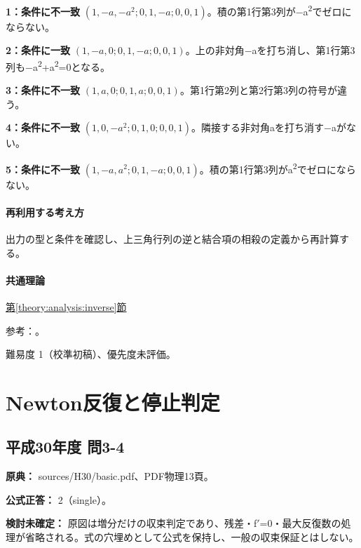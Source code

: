 \noindent\textbf{1：条件に不一致} \((1,-a,-a^2;0,1,-a;0,0,1)\)。積の第1行第3列が−a\textsuperscript{2}でゼロにならない。\par

\noindent\textbf{2：条件に一致} \((1,-a,0;0,1,-a;0,0,1)\)。上の非対角−aを打ち消し、第1行第3列も−a\textsuperscript{2}+a\textsuperscript{2}=0となる。\par

\noindent\textbf{3：条件に不一致} \((1,a,0;0,1,a;0,0,1)\)。第1行第2列と第2行第3列の符号が違う。\par

\noindent\textbf{4：条件に不一致} \((1,0,-a^2;0,1,0;0,0,1)\)。隣接する非対角aを打ち消す−aがない。\par

\noindent\textbf{5：条件に不一致} \((1,-a,a^2;0,1,-a;0,0,1)\)。積の第1行第3列がa\textsuperscript{2}でゼロにならない。\par

\paragraph{再利用する考え方} 出力の型と条件を確認し、上三角行列の逆と結合項の相殺の定義から再計算する。

\paragraph{共通理論} \hyperref[theory:analysis:inverse]{第\ref*{theory:analysis:inverse}節}

\par 参考：\cite{mit_inverse2007}。

\par 難易度 1（校準初稿）、優先度未評価。

\section{Newton反復と停止判定}

\subsection{平成30年度 問3-4}
\label{q:h30-reg-basic-3-4}

\noindent\textbf{原典：} sources/H30/basic.pdf、PDF物理13頁。

\textbf{公式正答：} 2（single）。

\par\textbf{検討未確定：} 原図は増分だけの収束判定であり、残差・f\ensuremath{'}=0・最大反復数の処理が省略される。式の穴埋めとして公式を保持し、一般の収束保証とはしない。

